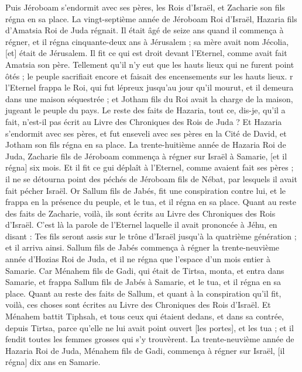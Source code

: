 \begin{multicols}{2}
Puis Jéroboam s'endormit avec ses pères, les Rois d'Israël, et Zacharie son fils régna en sa place.
\VerseOne{}La vingt-septième année de Jéroboam Roi d'Israël, Hazaria fils d'Amatsia Roi de Juda régnait.
Il était âgé de seize ans quand il commença à régner, et il régna cinquante-deux ans à Jérusalem ; sa mère avait nom Jécolia, [et] était de Jérusalem.
Il fit ce qui est droit devant l'Eternel, comme avait fait Amatsia son père.
Tellement qu'il n'y eut que les hauts lieux qui ne furent point ôtés ; le peuple sacrifiait encore et faisait des encensements sur les hauts lieux.
r l'Eternel frappa le Roi, qui fut lépreux jusqu'au jour qu'il mourut, et il demeura dans une maison séquestrée ; et Jotham fils du Roi avait la charge de la maison, jugeant le peuple du pays.
Le reste des faits de Hazaria, tout ce, dis-je, qu'il a fait, n'est-il pas écrit au Livre des Chroniques des Rois de Juda ?
Et Hazaria s'endormit avec ses pères, et fut enseveli avec ses pères en la Cité de David, et Jotham son fils régna en sa place.
La trente-huitième année de Hazaria Roi de Juda, Zacharie fils de Jéroboam commença à régner sur Israël à Samarie, [et il régna] six mois.
Et il fit ce gui déplaît à l'Eternel, comme avaient fait ses pères ; il ne se détourna point des péchés de Jéroboam fils de Nébat, par lesquels il avait fait pécher Israël.
Or Sallum fils de Jabés, fit une conspiration contre lui, et le frappa en la présence du peuple, et le tua, et il régna en sa place.
Quant au reste des faits de Zacharie, voilà, ils sont écrits au Livre des Chroniques des Rois d'Israël.
C'est là la parole de l'Eternel laquelle il avait prononcée à Jéhu, en disant : Tes fils seront assis sur le trône d'Israël jusqu'à la quatrième génération ; et il arriva ainsi.
Sallum fils de Jabés commença à régner la trente-neuvième année d'Hozias Roi de Juda, et il ne régna que l'espace d'un mois entier à Samarie.
Car Ménahem fils de Gadi, qui était de Tirtsa, monta, et entra dans Samarie, et frappa Sallum fils de Jabés à Samarie, et le tua, et il régna en sa place.
Quant au reste des faits de Sallum, et quant à la conspiration qu'il fit, voilà, ces choses sont écrites au Livre des Chroniques des Rois d'Israël.
Et Ménahem battit Tiphsah, et tous ceux qui étaient dedans, et dans sa contrée, depuis Tirtsa, parce qu'elle ne lui avait point ouvert [les portes], et les tua ; et il fendit toutes les femmes grosses qui s'y trouvèrent.
La trente-neuvième année de Hazaria Roi de Juda, Ménahem fils de Gadi, commença à régner sur Israël, [il régna] dix ans en Samarie.

\end{multicols}
